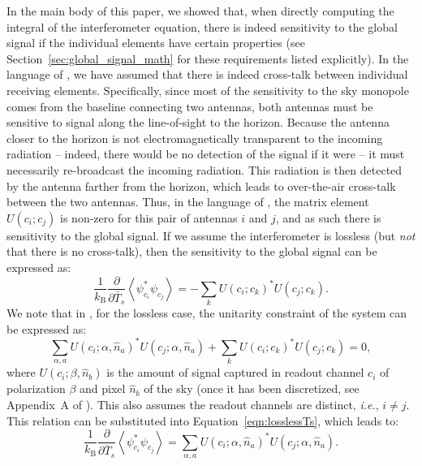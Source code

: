 In the main body of this paper, we showed that, when directly computing the
integral of the interferometer equation, there is indeed sensitivity to the
global signal if the individual elements have certain properties (see
Section~\ref{sec:global_signal_math} for these requirements listed explicitly). In the
language of \citealt{Venumadhav.16}, we have assumed that there is indeed cross-talk between
individual receiving elements. Specifically, since most of the sensitivity to
the sky monopole comes from the baseline connecting two antennas, both antennas
must be sensitive to signal along the line-of-sight to the horizon. Because the
antenna closer to the horizon is not electromagnetically transparent to the
incoming radiation -- indeed, there would be no detection of the signal if it
were -- it must necessarily re-broadcast the incoming radiation. This radiation
is then detected by the antenna farther from the horizon, which leads to
over-the-air cross-talk between the two antennas. Thus, in the language of \citealt{Venumadhav.16},
the matrix element $U(c_i; c_j)$ is non-zero for this pair of antennas $i$ and
$j$, and as such there is sensitivity to the global signal. If we assume the
interferometer is lossless (but \textit{not} that there is no cross-talk), then
the sensitivity to the global signal can be expressed as:
\begin{equation}
\frac{1}{k_\mathrm{B}} \frac{\partial}{\partial\bar{T}_s} \left\langle\psi_{c_i}^* \psi_{c_j}\right\rangle =
- \sum_k U(c_i; c_k)^* U(c_j; c_k). 
\label{eqn:losslessTs}
\end{equation}
We note that in \citealt{Venumadhav.16}, for the lossless case, the unitarity constraint of the
system can be expressed as:
\begin{equation}
\sum_{\alpha,a} U(c_i; \alpha, \hat{n}_a)^* U(c_j; \alpha, \hat{n}_a) + \sum_k U(c_i; c_k)^* U(c_j; c_k) = 0,
\end{equation}
where $U(c_i; \beta, \hat{n}_b)$ is the amount of signal captured in readout
channel $c_i$ of polarization $\beta$ and pixel $\hat{n}_b$ of the sky (once it
has been discretized, see Appendix~A of \citealt{Venumadhav.16}). This also assumes the readout
channels are distinct, \textit{i.e.}, $i \neq j$. This relation can be
substituted into Equation~\ref{eqn:losslessTs}, which leads to:
\begin{equation}
\frac{1}{k_\mathrm{B}} \frac{\partial}{\partial\bar{T}_s} \left\langle\psi_{c_i}^* \psi_{c_j}\right\rangle =
\sum_{\alpha, a} U(c_i; \alpha, \hat{n}_a)^* U(c_j; \alpha, \hat{n}_a).
\label{eqn:skyTs}
\end{equation}
